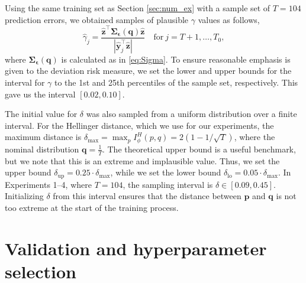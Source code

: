 \documentclass[10pt, twocolumn]{article}
\theoremstyle{plain}
\theoremstyle{definition}
\begin{document}
\begin{appendices}
Using the same training set as Section \ref{sec:num_ex} with a sample 
set of \(T=104\) prediction errors, we obtained samples of
plausible \(\gamma\) values as follows,
\[
	\hat{\gamma}_j = \frac{\hat{\bm{z}}^\top \bm{\Sigma}_{\bm{\epsilon}}(\bm{q}) \hat{\bm{z}}}{| \hat{\bm{y}}_j^\top \hat{\bm{z}} |} \quad \text{for}\ j=T+1,\ldots, T_0,
\]
where \(\bm{\Sigma}_{\bm{\epsilon}}(\bm{q})\) is calculated as in 
\eqref{eq:Sigma}. To ensure reasonable emphasis is given to the deviation 
risk measure, we set the lower and upper bounds for the interval for
\(\gamma\) to the 1st and 25th percentiles of the sample set, 
respectively. This gave us the interval \([0.02, 0.10]\). 

The initial value for \(\delta\) was also sampled from a uniform 
distribution over a finite interval. For the Hellinger distance,
which we use for our experiments, the maximum distance is 
\(\delta_{\max}  = \max_{p} I^{H}_{\phi}(p,q) = 2(1 - 1/\sqrt{T})\), 
where the nominal distribution \(\bm{q} = \frac{1}{T}\). 
The theoretical upper bound is a useful benchmark, but we note that this 
is an extreme and implausible value. Thus, we set the upper bound 
\(\delta_{\text{up}} = 0.25\cdot\delta_{\text{max}}\), while we set the lower 
bound \(\delta_{\text{lo}} = 0.05\cdot\delta_{\text{max}}\). In Experiments 
1--4, where \(T=104\), the sampling interval is \(\delta\in[0.09, 0.45]\). 
Initializing \(\delta\) from this interval ensures that the distance between 
\(\bm{p}\) and \(\bm{q}\) is not too extreme at the start of the training process.

\onecolumn
\section{Validation and hyperparameter selection}\label{app:add_exp}



\end{appendices}
\end{document}
